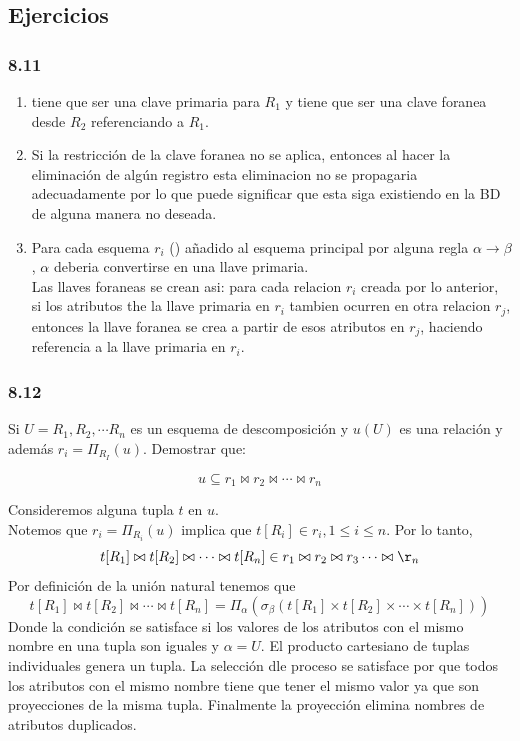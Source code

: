 \documentclass[twoside]{article}
\begin{document}
\subsection*{Ejercicios}
\subsubsection*{8.11}
\begin{enumerate}
      \item \alpha tiene que ser una clave primaria para $R_1$ y \alpha tiene que ser una clave
            foranea desde $R_2$ referenciando a $R_1$.
      \item Si la restricci\'on de la clave foranea no se aplica, entonces al hacer la eliminación
            de algún registro esta eliminacion no se propagaria adecuadamente por lo que puede significar
            que esta siga existiendo en la BD de alguna manera no deseada.
      \item Para cada esquema $r_i$ (\alpha \beta) añadido al esquema principal por alguna regla $\alpha \rightarrow \beta$, $\alpha$
            deberia convertirse en una llave primaria.\\
            Las llaves foraneas se crean asi: para cada relacion $r_i$ creada por lo anterior, si los atributos the la llave primaria en
            $r_i$ tambien ocurren en otra relacion $r_j$, entonces la llave foranea se crea a partir de esos atributos en $r_j$, haciendo
            referencia a la llave primaria en $r_i$.
\end{enumerate}
\subsubsection*{8.12}
Si $U = R_1, R_2, \cdots R_n$ es un esquema de descomposici\'on y $u(U)$ es una relaci\'on y adem\'as
$r_i = \Pi_{R_I}(u)$. Demostrar que:

$$u \subseteq r_1 \bowtie r_2 \bowtie \cdots \bowtie r_n$$

Consideremos alguna tupla $t$ en $u$.\\
Notemos que $r_i = \Pi_{R_i}(u)$ implica que $t[R_i] \in r_i, 1 \leq i \leq n$. Por lo tanto,\\
$$t[R_1] \bowtie t[R_2] \bowtie \cdots \bowtie t[R_n] \in r_1 \bowtie r_2 \bowtie r_3 \cdots \bowtie \r_n$$
Por definici\'on de la unión natural tenemos que\\
$$t[R_1] \bowtie t[R_2] \bowtie \cdots \bowtie t[R_n] = \Pi_{\alpha} (\sigma_{\beta}(t[R_1] \times t[R_2] \times \cdots \times t[R_n]))$$
Donde la condici\'on \beta se satisface si los valores de los atributos con el mismo nombre en una tupla son iguales y $\alpha = U$.
El producto cartesiano de tuplas individuales genera un tupla. La selección dle proceso se satisface por que todos los atributos
con el mismo nombre tiene que tener el mismo valor ya que son proyecciones de la misma tupla. Finalmente la proyecci\'on elimina
nombres de atributos duplicados.\\
\end{document}
